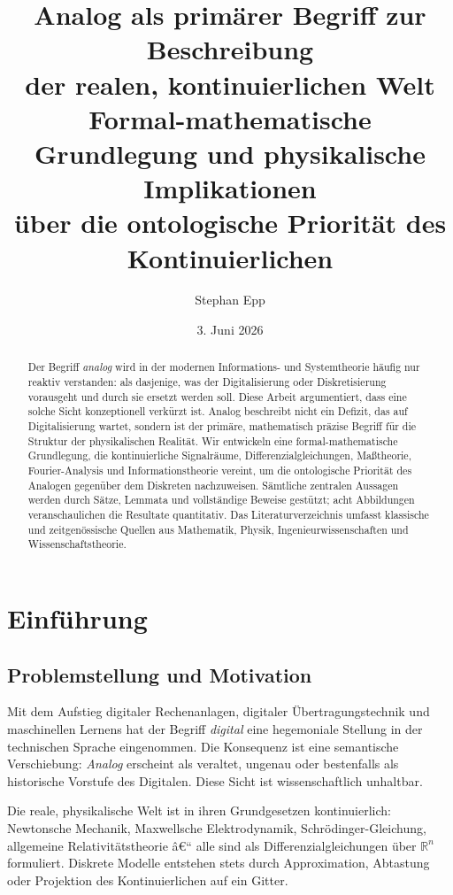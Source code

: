 ﻿\documentclass[a4paper,12pt]{article}
\title{\textbf{Analog als primärer Begriff zur Beschreibung\\
der realen, kontinuierlichen Welt}\\[0.5em]
\large Formal-mathematische Grundlegung und physikalische Implikationen\\
über die ontologische Priorität des Kontinuierlichen}
\author{Stephan Epp\\}
\date{3. Juni 2026}
\theoremstyle{definition}
\begin{document}
\maketitle

\begin{abstract}
\noindent
Der Begriff \emph{analog} wird in der modernen Informations- und Systemtheorie häufig nur reaktiv
verstanden: als dasjenige, was der Digitalisierung oder Diskretisierung vorausgeht und durch sie
ersetzt werden soll.  Diese Arbeit argumentiert, dass eine solche Sicht konzeptionell verkürzt ist.
Analog beschreibt nicht ein Defizit, das auf Digitalisierung wartet, sondern ist der primäre,
mathematisch präzise Begriff für die Struktur der physikalischen Realität.
Wir entwickeln eine formal-mathematische Grundlegung, die kontinuierliche Signalräume,
Differenzialgleichungen, Maßtheorie, Fourier-Analysis und Informationstheorie vereint,
um die ontologische Priorität des Analogen gegenüber dem Diskreten nachzuweisen.
Sämtliche zentralen Aussagen werden durch Sätze, Lemmata und vollständige Beweise gestützt;
acht Abbildungen veranschaulichen die Resultate quantitativ.
Das Literaturverzeichnis umfasst klassische und zeitgenössische Quellen aus Mathematik,
Physik, Ingenieurwissenschaften und Wissenschaftstheorie.
\end{abstract}

\tableofcontents
\newpage

\section{Einführung}

\subsection{Problemstellung und Motivation}

Mit dem Aufstieg digitaler Rechenanlagen, digitaler Übertragungstechnik und
maschinellen Lernens hat der Begriff \emph{digital} eine hegemoniale Stellung in der
technischen Sprache eingenommen.  Die Konsequenz ist eine semantische Verschiebung:
\emph{Analog} erscheint als veraltet, ungenau oder bestenfalls als historische
Vorstufe des Digitalen.  Diese Sicht ist wissenschaftlich unhaltbar.

Die reale, physikalische Welt ist in ihren Grundgesetzen kontinuierlich:
Newtonsche Mechanik, Maxwellsche Elektrodynamik, Schrödinger-Gleichung, allgemeine
Relativitätstheorie â€“ alle sind als Differenzialgleichungen über $\mathbb{R}^n$
formuliert.  Diskrete Modelle entstehen stets durch Approximation, Abtastung oder
Projektion des Kontinuierlichen auf ein Gitter.
\end{document}
